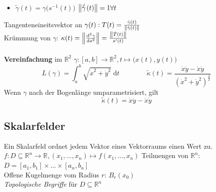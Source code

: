 \documentclass[6pt,a4paper]{scrartcl}
\newcommand{\norm}[2][\relax]{\ifx#1\relax \ensuremath{\left\Vert#2\right\Vert}\else \ensuremath{\left\Vert#2\right\Vert_{#1}}\fi}
\begin{document}
\begin{multicols*}{4}
\begin{itemize}
	\item $\tilde \gamma(t)=\gamma \bigl(s^{-1}(t) \bigr)$ \qquad $\norm{\ \dot{\tilde \!\! \gamma \!}\; (t)}=1 \forall t$ %
\end{itemize}
Tangenteneineitsvektor an $\gamma(t): T(t)=\frac{\dot \gamma(t)}{\norm{\dot \gamma(t)} }$\\
Krümmung von $\gamma$: $\kappa(t)= \norm{\frac{\mathrm d^2 \gamma}{\mathrm d s^2}} = \frac{\norm{\dot T(t)}}{s'(t)}$\\
\\
\textbf{Vereinfachung} im $\mathbb{R}^2$ \qquad $\gamma:[a,b] \rightarrow \mathbb R^2, t \mapsto \bigl(x(t),y(t)\bigr)$ \\
\begin{equation*}
L(\gamma) = \int_a^b \sqrt{\dot x^2 + \dot y^2}\; \mathrm dt \qquad \qquad \tilde{\kappa}(t)=\frac{\dot x \ddot y - \ddot x \dot y}{(\dot x^2 + \dot y^2)^{\frac{3}{2}}}
\end{equation*}
Wenn $\gamma$ nach der Bogenlänge umparametrisiert, gilt
\begin{equation*}
\tilde{\kappa}(t)=\dot x \ddot y - \ddot x \dot y
\end{equation*}



\subsection{Skalarfelder}
Ein Skalarfeld ordnet jedem Vektor eines Vektorraums einen Wert zu.\\
$ f:D\subseteq \mathbb R^n \rightarrow \mathbb R, (x_1,\ldots ,x_n) \mapsto f(x_1,\ldots ,x_n) $
Teilmengen von $\mathbb R^n$: $D = [a_1,b_1] \times ... \times [a_n,b_n]$\\
Offene Kugelmenge vom Radius $r$: $B_r(x_0)$\\
\emph{Topologische Begriffe} für $D \subseteq \mathbb R^n$


\end{multicols*}
\end{document}
